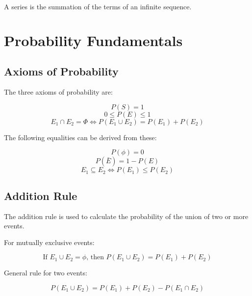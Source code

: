 \documentclass[a4paper, 10pt]{article}
\begin{document}
	A series is the summation of the terms of an infinite sequence.


	\newpage
	\section{Probability Fundamentals}
	\subsection{Axioms of Probability}

	\noindent The three axioms of probability are:

	\begin{equation*}
		P(S)=1
	\end{equation*}
	\begin{equation*}
		0\leq P(E)\leq 1
	\end{equation*}
	\begin{equation*}
		E_{1}\cap E_{2} = \Phi \Leftrightarrow P(E_{1}\cup E_{2}) = P(E_{1}) + P(E_{2})
	\end{equation*}

	\noindent The following equalities can be derived from these:

	\begin{equation*}
		P(\phi)=0
	\end{equation*}
	\begin{equation*}
	P(\bar{E})=1-P(E)
	\end{equation*}
	\begin{equation*}
		E_{1}\subseteq E_{2}\Leftrightarrow P(E_{1})\leq P(E_{2})
	\end{equation*}

	\subsection{Addition Rule}

	The addition rule is used to calculate the probability of the union of two or more events.

	\noindent For mutually exclusive events:

	\begin{equation*}
		\text{If }E_{1}\cup E_{2} = \phi \text{, then }P(E_{1}\cup E_{2})=P(E_{1})+P(E_{2})
	\end{equation*}

	\noindent General rule for two events:

	\begin{equation*}
		P(E_{1}\cup E_{2}) = P(E_{1}) + P(E_{2}) - P(E_{1}\cap E_{2})
	\end{equation*}
\end{document}
